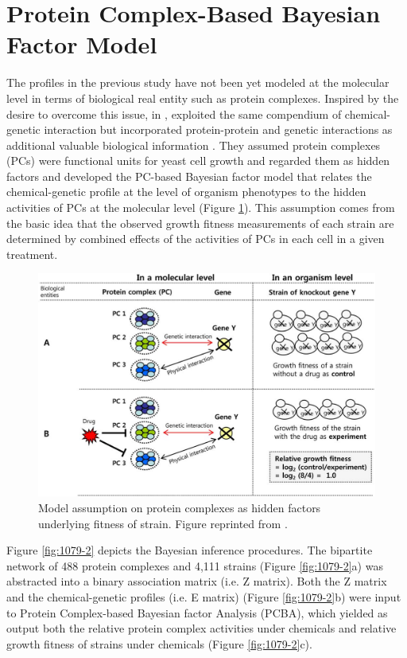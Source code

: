 \documentclass[12pt,fullpage,singlespace]{article}
\begin{document}
\section{Protein Complex-Based Bayesian Factor Model}

The profiles in the previous study \citep{1078} have not been yet modeled at the molecular level in terms of biological real entity such as protein complexes. Inspired by the desire to overcome this issue, in \citeyear{1079},  exploited the same compendium of chemical-genetic interaction but incorporated protein-protein and genetic interactions as additional valuable biological information \citep{1079}. They assumed protein complexes (PCs) were functional units for yeast cell growth and regarded them as hidden factors and developed the PC-based Bayesian factor model that relates the chemical-genetic profile at the level of organism phenotypes to the hidden activities of PCs at the molecular level (Figure \ref{fig:1079-1}). This assumption comes from the basic idea that the observed growth fitness measurements of each strain are determined by combined effects of the activities of PCs in each cell in a given treatment.

\begin{figure}
\centering
\includegraphics[width=\linewidth]{1079-1.png}
\caption{Model assumption on protein complexes as hidden factors underlying fitness of strain. Figure reprinted from \citep{1079}.}
\label{fig:1079-1}
\end{figure}

Figure \ref{fig:1079-2} depicts the Bayesian inference procedures. The bipartite network of 488 protein complexes and 4,111 strains (Figure \ref{fig:1079-2}a) was abstracted into a binary association matrix (i.e. Z matrix). Both the Z matrix and the chemical-genetic profiles (i.e. E matrix) (Figure \ref{fig:1079-2}b) were input to Protein Complex-based Bayesian factor Analysis (PCBA), which yielded as output both the relative protein complex activities under chemicals and relative growth fitness of strains under chemicals (Figure \ref{fig:1079-2}c).
\end{document}
